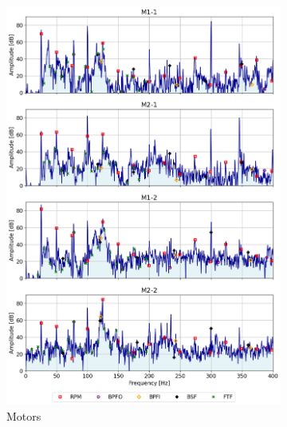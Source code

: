 \documentclass{llncs}
\begin{document}
\begin{figure}
\begin{subfigure}[b]{0.3\textwidth}
         \includegraphics[width=\textwidth]{fig/spectrum/motor-fault.png}
         \caption{Motors}
         \label{fig:motor-fault}
     \end{subfigure}
     \hfill
     \begin{subfigure}[b]{0.3\textwidth}
         \centering

\end{subfigure}
\end{figure}
\end{document}
